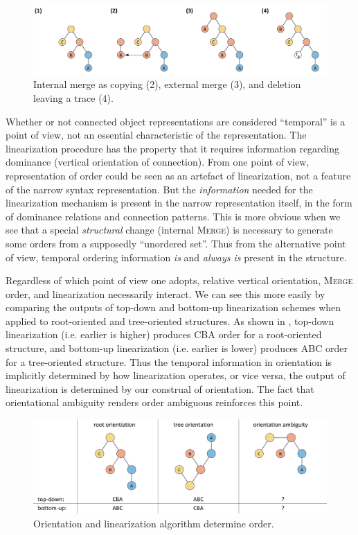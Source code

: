   
\begin{figure}
\includegraphics[width=\textwidth]{figures/Tilsen-img43.png}
\caption{Internal merge as copying (2), external merge (3), and deletion leaving a trace (4).}
\label{fig:3:15}
\end{figure}
 

  Whether or not connected object representations are considered “temporal” is a point of view, not an essential characteristic of the representation. The linearization procedure has the property that it requires information regarding dominance (vertical orientation of connection). From one point of view, representation of order could be seen as an artefact of linearization, not a feature of the narrow syntax representation. But the \textit{information} needed for the linearization mechanism is present in the narrow representation itself, in the form of dominance relations and connection patterns. This is more obvious when we see that a special \textit{structural} change (internal \textsc{Merge}) is necessary to generate some orders from a supposedly “unordered set”. Thus from the alternative point of view, temporal ordering information \textit{is} and \textit{always is} present in the structure. 

  Regardless of which point of view one adopts, relative vertical orientation, \textsc{Merge} order, and linearization necessarily interact. We can see this more easily by comparing the outputs of top-down and bottom-up linearization schemes when applied to root-oriented and tree-oriented structures. As shown in {}, top-down linearization (i.e. earlier is higher) produces CBA order for a root-oriented structure, and bottom-up linearization (i.e. earlier is lower) produces ABC order for a tree-oriented structure. Thus the temporal information in orientation is implicitly determined by how linearization operates, or vice versa, the output of linearization is determined by our construal of orientation. The fact that orientational ambiguity renders order ambiguous reinforces this point.

  
\begin{figure}
\includegraphics[width=\textwidth]{figures/Tilsen-img44.png}
\caption{Orientation and linearization algorithm determine order.}
\label{fig:3:16}
\end{figure}
 

